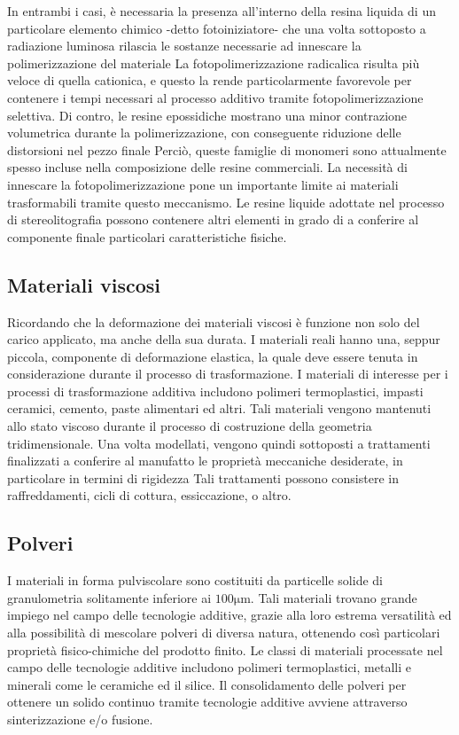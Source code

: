In entrambi i casi, è necessaria la presenza all'interno della resina liquida di un particolare
elemento chimico -detto fotoiniziatore- che una volta sottoposto a radiazione luminosa
rilascia le sostanze necessarie ad innescare la polimerizzazione del materiale
La fotopolimerizzazione radicalica risulta più veloce di quella cationica, e questo la rende
particolarmente favorevole per contenere i tempi necessari al processo additivo tramite
fotopolimerizzazione selettiva.
Di contro, le resine epossidiche mostrano una minor contrazione volumetrica durante la
polimerizzazione, con conseguente riduzione delle distorsioni nel pezzo finale
Perciò, queste famiglie di monomeri sono attualmente spesso incluse nella composizione
delle resine commerciali.
La necessità di innescare la fotopolimerizzazione pone un importante limite ai materiali
trasformabili tramite questo meccanismo.
Le resine liquide adottate nel processo di stereolitografia possono contenere altri elementi
in grado di a conferire al componente finale particolari caratteristiche fisiche.

\subsection{Materiali viscosi}
Ricordando che la deformazione dei materiali viscosi è funzione non solo del carico applicato,
ma anche della sua durata.
I materiali reali hanno una, seppur piccola, componente di deformazione elastica, la quale
deve essere tenuta in considerazione durante il processo di trasformazione.
I materiali di interesse per i processi di trasformazione additiva includono polimeri
termoplastici, impasti ceramici, cemento, paste alimentari ed altri.
Tali materiali vengono mantenuti allo stato viscoso durante il processo di costruzione della
geometria tridimensionale.
Una volta modellati, vengono quindi sottoposti a trattamenti finalizzati a conferire al
manufatto le proprietà meccaniche desiderate, in particolare in termini di rigidezza
Tali trattamenti possono consistere in raffreddamenti, cicli di cottura, essiccazione, o altro.

\subsection{Polveri}
I materiali in forma pulviscolare sono costituiti da particelle solide di granulometria
solitamente inferiore ai $100\unit{\um}$.
Tali materiali trovano grande impiego nel campo delle tecnologie additive, grazie alla loro
estrema versatilità ed alla possibilità di mescolare polveri di diversa natura, ottenendo così
particolari proprietà fisico-chimiche del prodotto finito.
Le classi di materiali processate nel campo delle tecnologie additive includono polimeri
termoplastici, metalli e minerali come le ceramiche ed il silice.
Il consolidamento delle polveri per ottenere un solido continuo tramite tecnologie additive
avviene attraverso sinterizzazione e/o fusione.

